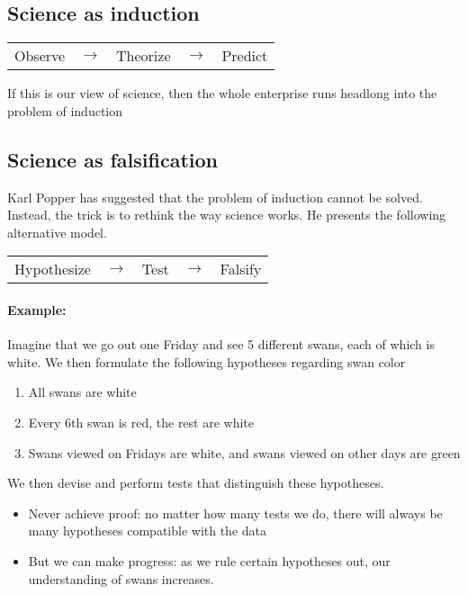 \documentclass[10pt]{article}
\begin{document}
\subsection{Science as induction}
\begin{center}
\begin{tabular}{ccccc}
Observe & $\longrightarrow$ & Theorize & $\longrightarrow$ & Predict \\
\end{tabular}
\end{center}

If this is our view of science, then the whole enterprise runs headlong into the problem of induction

\subsection{Science as falsification}
Karl Popper has suggested that the problem of induction cannot be solved.  Instead, the trick is to rethink the way science works.  He presents the following alternative model.
\begin{center}
\begin{tabular}{ccccc}
Hypothesize & $\longrightarrow$ & Test & $\longrightarrow$ & Falsify \\
\end{tabular}
\end{center}

\paragraph{Example:} Imagine that we go out one Friday and see 5 different swans, each of which is white. We then formulate the following hypotheses regarding swan color

\begin{enumerate}[(H1)]
 \item All swans are white
 \item Every 6th swan is red, the rest are white
 \item Swans viewed on Fridays are white, and swans viewed on other days are green
\end{enumerate}

We then devise and perform tests that distinguish these hypotheses.  
\begin{itemize}
 \item Never achieve proof: no matter how many tests we do, there will always be many hypotheses compatible with the data
 \item But we can make progress: as we rule certain hypotheses out, our understanding of swans increases.
\end{itemize}
\end{document}

